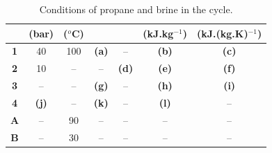 \documentclass[calculator,steamtables,refrigeranttables,psychrometricchart,datasheet,solutions]{exam}
\begin{document}
\begin{question}
\begin{enumerate}[(a)]
\begin{table}[h]
\begin{center}
\begin{tabular} {||c | c c c c c c || }
            & {\bf (bar)}& {\bf ($^{o}$C)} &               &                     & {\bf (kJ.kg$^{-1}$)}  & {\bf (kJ.(kg.K)$^{-1}$)}  \\
\hline\hline
 {\bf 1 }   & 40         & 100            &   {\bf (a)}    &    --               & {\bf (b)}           & {\bf (c)}                \\
 {\bf 2 }   & 10         &  --            &   --           & {\bf (d)}           & {\bf (e)}           & {\bf (f)}                 \\
 {\bf 3 }   & --         & --             &   {\bf (g)}    & --                  & {\bf (h)}           & {\bf (i)}                \\
 {\bf 4 }   & {\bf (j)}  & --             &   {\bf (k)}    & --                  & {\bf (l)}           & --                      \\
 {\bf A }   & --         & 90             &   --           & --                  & --                  & --                       \\
 {\bf B }   & --         & 30             &   --           & --                  & --                  & --                       \\
 \hline\hline
\end{tabular}
\end{center}
\caption{Conditions of propane and brine in the cycle.}\label{Q2_Table}
\end{table}


\end{enumerate}
\end{question}
\end{document}
